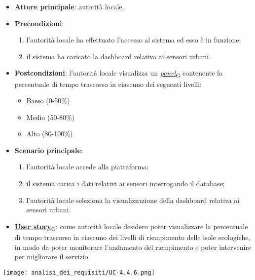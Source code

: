 \begin{itemize}
	\item \textbf{Attore principale}: autorità locale.
	\item \textbf{Precondizioni}:
	      \begin{enumerate}
		      \item l'autorità locale ha effettuato l'accesso al sistema ed esso è in funzione;
		      \item il sistema ha caricato la dashboard relativa ai sensori urbani.
	      \end{enumerate}
	\item \textbf{Postcondizioni}: l'autorità locale visualizza un \href{https://7last.github.io/docs/pb/documentazione-interna/glossario\#panel}{\textit{panel}\textsubscript{G}} contenente la percentuale di tempo trascorso in ciascuno dei seguenti livelli:
	      \begin{itemize}
		      \item Basso (0-50\%)
		      \item Medio (50-80\%)
		      \item Alto (80-100\%)
	      \end{itemize}
	\item \textbf{Scenario principale}:
	      \begin{enumerate}
		      \item l'autorità locale accede alla piattaforma;
		      \item il sistema carica i dati relativi ai sensori interrogando il database;
		      \item l'autorità locale seleziona la visualizzazione della dashboard relativa ai sensori urbani.
	      \end{enumerate}
	\item \href{https://7last.github.io/docs/pb/documentazione-interna/glossario\#user-story}{\textbf{User story}\textsubscript{G}}:
	      come autorità locale desidero poter visualizzare la percentuale di tempo trascorso in ciascuno dei livelli di riempimento delle isole ecologiche,
	      in modo da poter monitorare l'andamento del riempimento e poter intervenire per migliorare il servizio.
\end{itemize}
\begin{center}
	\texttt{[image: analisi\_dei\_requisiti/UC-4.4.6.png]}
\end{center}

